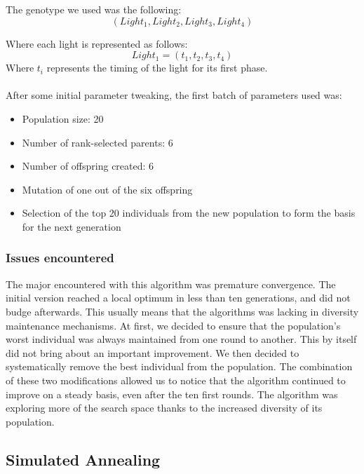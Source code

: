 \documentclass{article} %
\begin{document}
The genotype we used was the following:
\begin{equation}
  (Light_1, Light_2, Light_3, Light_4)
\end{equation}

Where each light is represented as follows:
\begin{equation}
 Light_1 = (t_1, t_2, t_3, t_4)
\end{equation}
Where $t_i$ represents the timing of the light for its first phase. \\
$\;$\\
After some initial parameter tweaking, the first batch of parameters used was:
\begin{itemize}
 \item Population size: 20
 \item Number of rank-selected parents: 6
 \item Number of offspring created: 6
 \item Mutation of one out of the six offspring
 \item Selection of the top 20 individuals from the new population to form the basis for the next generation
\end{itemize}


\subsubsection{Issues encountered}
The major encountered with this algorithm was premature convergence. The initial version reached a local optimum in less than ten generations, and did not budge afterwards. This usually means that the algorithms was lacking in diversity maintenance mechanisms. At first, we decided to ensure that the population's worst individual was always maintained from one round to another. This by itself did not bring about an important improvement. 
We then decided to systematically remove the best individual from the population. The combination of these two modifications allowed us to notice that the algorithm continued to improve on a steady basis, even after the ten first rounds. The algorithm was exploring more of the search space thanks to the increased diversity of its population.


\subsection{Simulated Annealing}
\end{document}
